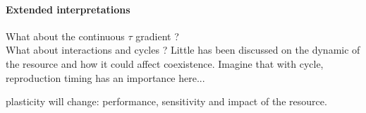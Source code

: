 \paragraph{Extended interpretations}
What about the continuous $\tau$ gradient ?\\

What about interactions and cycles ? Little has been discussed on the dynamic of the resource and how it could affect coexistence. Imagine that with cycle, reproduction timing has an importance here...


plasticity will change: performance, sensitivity and impact of the resource.


%
%
%
%
